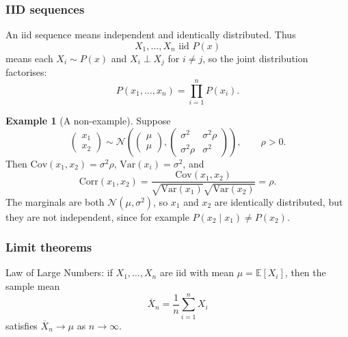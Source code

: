 \documentclass[11pt, titlepage]{article} %
\numberwithin{equation}{section}
\theoremstyle{definition}
\newtheorem*{example*}{Example}
\numberwithin{assumption}{section}
\begin{document}
\subsubsection*{IID sequences}

An iid sequence means independent and identically distributed. Thus
\begin{equation*}
    X_1,\dots,X_n \text{ iid } P(x)
\end{equation*}
means each $X_i\sim P(x)$ and $X_i\perp X_j$ for $i\ne j$, so the joint distribution factorises:
\begin{equation*}
    P(x_1,\dots,x_n)=\prod_{i=1}^n P(x_i).
\end{equation*}

\begin{example*}[A non-example]
Suppose
\begin{equation*}
    \begin{pmatrix}x_1\\x_2\end{pmatrix}
    \sim
    \mathcal{N}\!\left(
    \begin{pmatrix}\mu\\ \mu\end{pmatrix},
    \begin{pmatrix}
        \sigma^2 & \sigma^2\rho\\
        \sigma^2\rho & \sigma^2
    \end{pmatrix}
    \right),
    \qquad \rho>0.
\end{equation*}
Then $\mathrm{Cov}(x_1,x_2)=\sigma^2\rho$, $\mathrm{Var}(x_i)=\sigma^2$, and
\begin{equation*}
    \mathrm{Corr}(x_1,x_2)=
    \frac{\mathrm{Cov}(x_1,x_2)}
    {\sqrt{\mathrm{Var}(x_1)}\sqrt{\mathrm{Var}(x_2)}}=\rho.
\end{equation*}
The marginals are both $\mathcal{N}(\mu,\sigma^2)$, so $x_1$ and $x_2$ are identically distributed, but they are not independent, since for example $P(x_2\mid x_1)\ne P(x_2)$.
\end{example*}

\subsubsection*{Limit theorems}

Law of Large Numbers:
if $X_1,\dots,X_n$ are iid with mean $\mu=\mathbb{E}[X_i]$, then the sample mean
\begin{equation*}
    \overline{X}_n=\frac{1}{n}\sum_{i=1}^n X_i
\end{equation*}
satisfies $\overline{X}_n\to \mu$ as $n\to\infty$.
\end{document}
